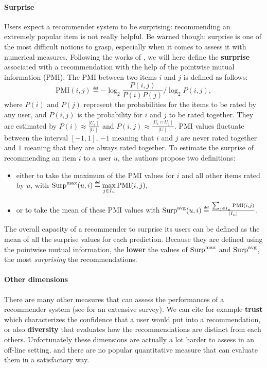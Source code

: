 \paragraph{Surprise\\}
Users expect a recommender system to be surprising: recommending an extremely
popular item is not really helpful. Be warned though: surprise is one of the
most difficult notions to grasp, especially when it comes to assess it with
numerical measures. Following the works of \cite{KamBriRecSys2014}, we will
here define the \textbf{surprise} associated with a recommendation with the
help of the pointwise mutual information (PMI). The PMI between two items $i$
and $j$ is defined as follows:
$$\text{PMI}(i, j) \eqdef -\log_2 \frac{P(i, j)}{P(i)P(j)} / \log_2 P(i, j),$$
where $P(i)$ and $P(j)$  represent the probabilities for the items to be rated
by any user, and $P(i, j)$ is the probability for $i$ and $j$ to be rated
together. They are estimated by $P(i) \approx \frac{\mid U_i \mid}{\mid U
\mid}$ and $P(i, j) \approx \frac{\mid U_i \cap U_j \mid}{\mid U\mid}$. PMI
values fluctuate between the interval $[-1, 1]$, $-1$ meaning that $i$ and $j$
are never rated together and $1$ meaning that they are always rated together.
To estimate the surprise of recommending an item $i$ to a user $u$, the authors
propose two definitions:
\begin{itemize}
\item either to take the maximum of the PMI values for $i$ and all other items
  rated by $u$, with $\surpmax(u, i) \eqdef \max\limits_{j\in I_u}
    \text{PMI}(i, j),$
\item
 or to take the mean of these PMI values with $\surpavg(u, i) \eqdef
    \frac{\sum_{j \in I_u} \text{PMI}(i, j)}{\mid I_u\mid }$.
\end{itemize}

The overall capacity of a recommender to surprise its users can be defined as
the mean of all the surprise values for each prediction. Because they are
defined using the pointwise mutual information, the \textbf{lower} the values
of $\text{Surp}^{\text{max}}$ and $\text{Surp}^{\text{avg}}$, the most \textit{surprising} the recommendations.


\paragraph{Other dimensions\\}

There are  many other measures that can assess the performances of a
recommender system (see \cite{ShaGun11} for an extensive survey). We can cite
for example \textbf{trust} which characterizes the confidence that a user would
put into a recommendation, or also \textbf{diversity} that evaluates how
the recommendations are distinct from each others.  Unfortunately these
dimensions are actually a lot harder to assess in an off-line setting, and
there are no popular quantitative measure that can evaluate them in a
satisfactory way.

